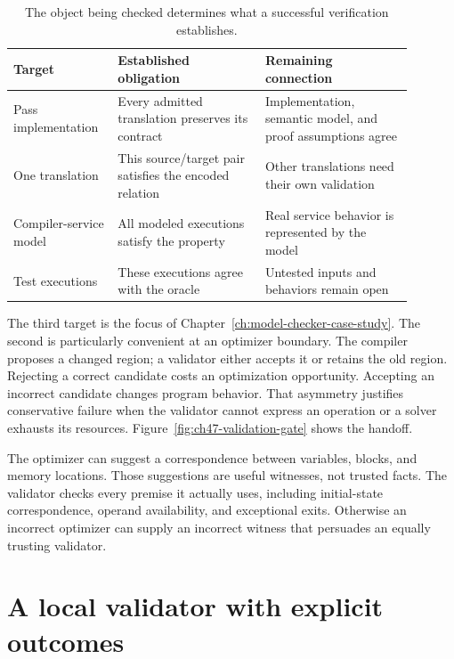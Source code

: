 \begin{table}[htbp]
\centering
\caption{The object being checked determines what a successful verification establishes.}
\label{tab:ch47-verification-targets}
\begin{tabular}{p{0.21\linewidth}p{0.34\linewidth}p{0.34\linewidth}}
\toprule
Target & Established obligation & Remaining connection \\
\midrule
Pass implementation & Every admitted translation preserves its contract & Implementation, semantic model, and proof assumptions agree \\
One translation & This source/target pair satisfies the encoded relation & Other translations need their own validation \\
Compiler-service model & All modeled executions satisfy the property & Real service behavior is represented by the model \\
Test executions & These executions agree with the oracle & Untested inputs and behaviors remain open \\
\bottomrule
\end{tabular}
\end{table}

The third target is the focus of Chapter~\ref{ch:model-checker-case-study}.
The second is particularly convenient at an optimizer boundary.
The compiler proposes a changed region; a validator either accepts it or retains the old region.
Rejecting a correct candidate costs an optimization opportunity.
Accepting an incorrect candidate changes program behavior.
That asymmetry justifies conservative failure when the validator cannot express an operation or a solver exhausts its resources.
Figure~\ref{fig:ch47-validation-gate} shows the handoff.



The optimizer can suggest a correspondence between variables, blocks, and memory locations.
Those suggestions are useful witnesses, not trusted facts.
The validator checks every premise it actually uses, including initial-state correspondence, operand availability, and exceptional exits.
Otherwise an incorrect optimizer can supply an incorrect witness that persuades an equally trusting validator.

\section{A local validator with explicit outcomes}
\label{sec:ch47-local-validator}

